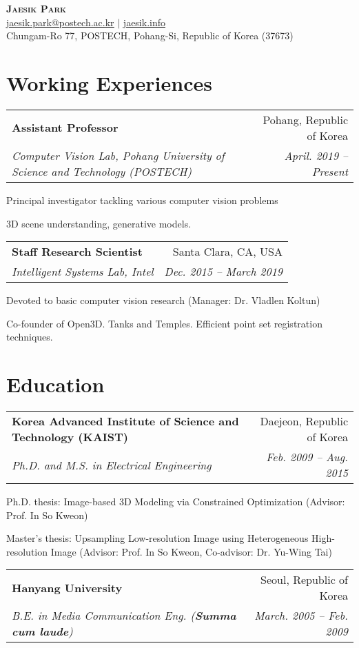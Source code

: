 \documentclass[letterpaper,11pt]{article}
\makeatletter
\newcommand{\resumeItem}[1]{
  \small{
  \item{#1 \vspace{-2pt}}
  }
}
\newcommand{\resumeSubheading}[4]{
  \vspace{-2pt}\item
    \begin{tabular*}{0.97\textwidth}[t]{l@{\extracolsep{\fill}}r}
      \textbf{#1} & #2 \\
      \textit{\small#3} & \textit{\small #4} \\
    \end{tabular*}\vspace{-7pt}
}
\newcommand{\resumeSubHeadingListStart}{\begin{itemize}[leftmargin=0.15in, label={}]}
\newcommand{\resumeSubHeadingListEnd}{\end{itemize}}
\newcommand{\resumeItemListStart}{\begin{itemize}}
\newcommand{\resumeItemListEnd}{\end{itemize}\vspace{-5pt}}
\makeatother
\begin{document}
\begin{center}
    \textbf{\Huge \scshape Jaesik Park} \\ \vspace{3pt}
    \small \href{mailto:jaesik.park@postech.ac.kr}{\underline{jaesik.park@postech.ac.kr}} $|$ 
    \href{http://jaesik.info}{\underline{jaesik.info}}\\
    \footnotesize{Chungam-Ro 77, POSTECH, Pohang-Si, Republic of Korea (37673)}
\end{center}

\section{Working Experiences}
  \resumeSubHeadingListStart
    \resumeSubheading
      {Assistant Professor}{Pohang, Republic of Korea}
      {Computer Vision Lab, Pohang University of Science and Technology (POSTECH)}{April. 2019 -- Present}
        \resumeItemListStart
            \resumeItem{Principal investigator tackling various computer vision problems}
            \resumeItem{3D scene understanding, generative models.}
        \resumeItemListEnd
    \resumeSubheading
      {Staff Research Scientist}{Santa Clara, CA, USA}
      {Intelligent Systems Lab, Intel}{Dec. 2015 -- March 2019}
        \resumeItemListStart
            \resumeItem{Devoted to basic computer vision research (Manager: Dr. Vladlen Koltun)}
            \resumeItem{Co-founder of Open3D. Tanks and Temples. Efficient point set registration techniques.}
        \resumeItemListEnd
  \resumeSubHeadingListEnd

\section{Education}
  \resumeSubHeadingListStart
    \resumeSubheading
      {Korea Advanced Institute of Science and Technology (KAIST)}{Daejeon, Republic of Korea}
      {Ph.D. and M.S. in Electrical Engineering}{Feb. 2009 -- Aug. 2015}
        \resumeItemListStart
        \resumeItem{Ph.D. thesis: Image-based 3D Modeling via Constrained Optimization (Advisor: Prof. In So Kweon)}
        \resumeItem{Master's thesis: Upsampling Low-resolution Image using Heterogeneous High-resolution Image (Advisor: Prof. In So Kweon, Co-advisor: Dr. Yu-Wing Tai)}
        \resumeItemListEnd
    \resumeSubheading
      {Hanyang University}{Seoul, Republic of Korea}
      {B.E. in Media Communication Eng. (\textbf{Summa cum laude})}{March. 2005 -- Feb. 2009}
  \resumeSubHeadingListEnd
\end{document}
